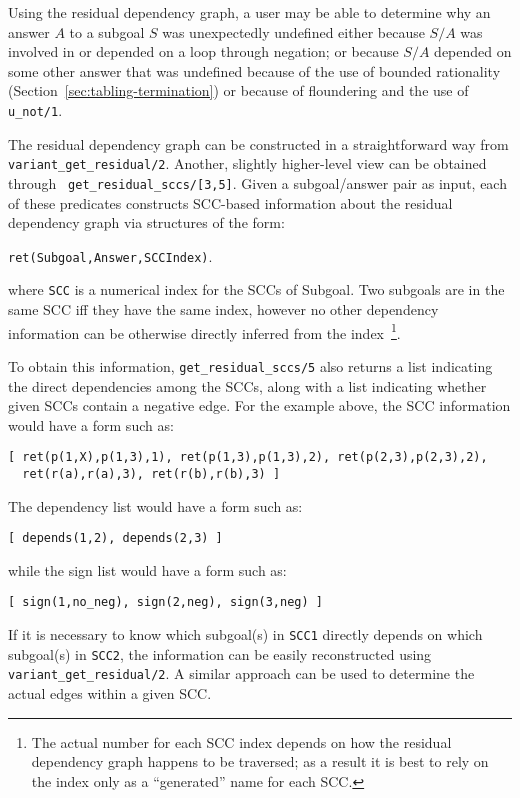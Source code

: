 \begin{description}
%
Using the residual dependency graph, a user may be able to determine
why an answer $A$ to a subgoal $S$ was unexpectedly undefined either
because $S/A$ was involved in or depended on a loop through negation;
or because $S/A$ depended on some other answer that was undefined
because of the use of bounded rationality
(Section~\ref{sec:tabling-termination}) or because of floundering and
the use of {\tt u\_not/1}.  

The residual dependency graph can be constructed in a straightforward
way from {\tt variant\_get\_residual/2}.  Another, slightly
higher-level view can be obtained through {\tt
  get\_residual\_sccs/[3,5]}.  Given a subgoal/answer pair as input,
each of these predicates constructs SCC-based information about the
residual dependency graph via structures of the form:
%
\begin{center}
{\tt ret(Subgoal,Answer,SCCIndex)}.
\end{center}
%
where {\tt SCC} is a numerical index for the SCCs of Subgoal. Two
subgoals are in the same SCC iff they have the same index, however no
other dependency information can be otherwise directly inferred from
the index~\footnote{The actual number for
  each SCC index depends on how the residual dependency graph happens
  to be traversed; as a result it is best to rely on the index only as
  a ``generated'' name for each SCC.}.

To obtain this information, {\tt get\_residual\_sccs/5} also returns a
list indicating the direct dependencies among the SCCs, along with a
list indicating whether given SCCs contain a negative edge.  For the
example above, the SCC information would have a form such as:
\begin{verbatim}
[ ret(p(1,X),p(1,3),1), ret(p(1,3),p(1,3),2), ret(p(2,3),p(2,3),2),
  ret(r(a),r(a),3), ret(r(b),r(b),3) ]
\end{verbatim}
%
The dependency list would have a form such as:
\begin{verbatim}
[ depends(1,2), depends(2,3) ]
\end{verbatim}
while the sign list would have a form such as:
\begin{verbatim}
[ sign(1,no_neg), sign(2,neg), sign(3,neg) ]
\end{verbatim}
If it is necessary to know which subgoal(s) in {\tt SCC1} directly
depends on which subgoal(s) in {\tt SCC2}, the information can be
easily reconstructed using {\tt variant\_get\_residual/2}.  A similar
approach can be used to determine the actual edges within a given SCC.


\end{description}
